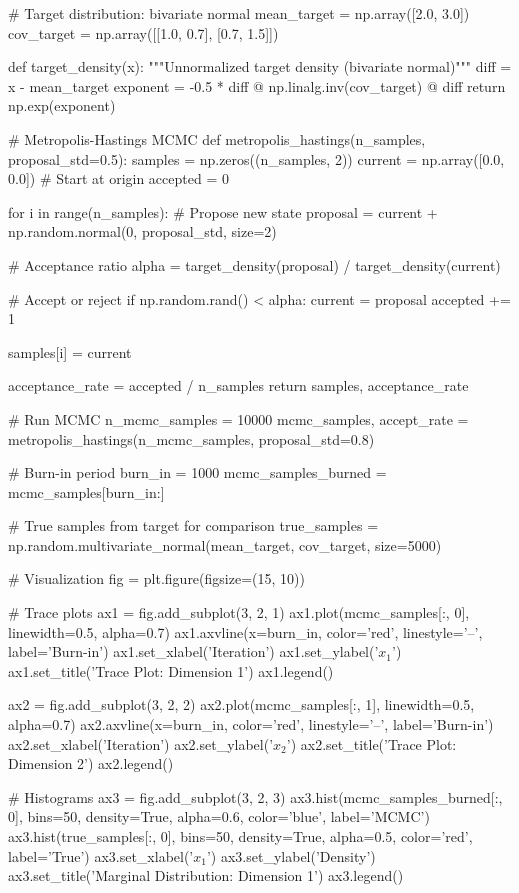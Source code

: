 \documentclass[11pt,a4paper]{article}
\begin{document}
\begin{pycode}
# Target distribution: bivariate normal
mean_target = np.array([2.0, 3.0])
cov_target = np.array([[1.0, 0.7],
                       [0.7, 1.5]])

def target_density(x):
    """Unnormalized target density (bivariate normal)"""
    diff = x - mean_target
    exponent = -0.5 * diff @ np.linalg.inv(cov_target) @ diff
    return np.exp(exponent)

# Metropolis-Hastings MCMC
def metropolis_hastings(n_samples, proposal_std=0.5):
    samples = np.zeros((n_samples, 2))
    current = np.array([0.0, 0.0])  # Start at origin
    accepted = 0

    for i in range(n_samples):
        # Propose new state
        proposal = current + np.random.normal(0, proposal_std, size=2)

        # Acceptance ratio
        alpha = target_density(proposal) / target_density(current)

        # Accept or reject
        if np.random.rand() < alpha:
            current = proposal
            accepted += 1

        samples[i] = current

    acceptance_rate = accepted / n_samples
    return samples, acceptance_rate

# Run MCMC
n_mcmc_samples = 10000
mcmc_samples, accept_rate = metropolis_hastings(n_mcmc_samples, proposal_std=0.8)

# Burn-in period
burn_in = 1000
mcmc_samples_burned = mcmc_samples[burn_in:]

# True samples from target for comparison
true_samples = np.random.multivariate_normal(mean_target, cov_target, size=5000)

# Visualization
fig = plt.figure(figsize=(15, 10))

# Trace plots
ax1 = fig.add_subplot(3, 2, 1)
ax1.plot(mcmc_samples[:, 0], linewidth=0.5, alpha=0.7)
ax1.axvline(x=burn_in, color='red', linestyle='--', label='Burn-in')
ax1.set_xlabel('Iteration')
ax1.set_ylabel('$x_1$')
ax1.set_title('Trace Plot: Dimension 1')
ax1.legend()

ax2 = fig.add_subplot(3, 2, 2)
ax2.plot(mcmc_samples[:, 1], linewidth=0.5, alpha=0.7)
ax2.axvline(x=burn_in, color='red', linestyle='--', label='Burn-in')
ax2.set_xlabel('Iteration')
ax2.set_ylabel('$x_2$')
ax2.set_title('Trace Plot: Dimension 2')
ax2.legend()

# Histograms
ax3 = fig.add_subplot(3, 2, 3)
ax3.hist(mcmc_samples_burned[:, 0], bins=50, density=True, alpha=0.6,
         color='blue', label='MCMC')
ax3.hist(true_samples[:, 0], bins=50, density=True, alpha=0.5,
         color='red', label='True')
ax3.set_xlabel('$x_1$')
ax3.set_ylabel('Density')
ax3.set_title('Marginal Distribution: Dimension 1')
ax3.legend()


\end{pycode}
\end{document}
